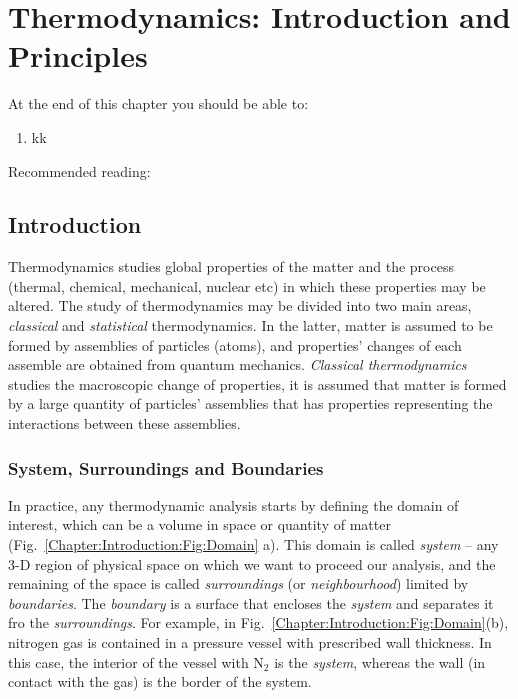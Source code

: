
\chapter{Thermodynamics: Introduction and Principles}\label{Chapter:Introduction}
   \begin{shaded}
      \noindent
      At the end of this chapter you should be able to:
        \begin{enumerate}
           \item kk
        \end{enumerate}
\bigskip
     Recommended reading: \cite{Devoe_Chpt1_2}
   \end{shaded}

\section{Introduction}\label{Chapter:Introduction:Section:Introduction}
Thermodynamics studies global properties of the matter and the process (\eg thermal, chemical, mechanical, nuclear etc) in which these properties may be altered. The study of thermodynamics may be divided into two main areas, {\it classical} and {\it statistical} thermodynamics. In the latter, matter is assumed to be formed by assemblies of particles (\ie atoms), and properties' changes of each assemble are obtained from quantum mechanics. {\it Classical thermodynamics} studies the macroscopic change of properties, \ie it is assumed that matter is formed by a large quantity of particles' assemblies that has properties representing the interactions between these assemblies. 

\subsection{System, Surroundings and Boundaries}\label{Chapter:Introduction:Section:Introduction:SystemSurroundingsBoundaries}
In practice, any thermodynamic analysis starts by defining the domain of interest, which can be a volume in space or quantity of matter (Fig.~\ref{Chapter:Introduction:Fig:Domain} a). This domain is called {\it system} -- \ie any 3-D region of physical space on which we want to proceed our analysis, and the remaining of the space is called {\it surroundings} (or {\it neighbourhood}) limited by {\it boundaries}. The {\it boundary} is a surface that encloses the {\it system} and separates it fro the {\it surroundings}. For example, in Fig.~\ref{Chapter:Introduction:Fig:Domain}(b), nitrogen gas is contained in a pressure vessel with prescribed wall thickness. In this case, the interior of the vessel with N$_{2}$ is the {\it system}, whereas the wall (in contact with the gas) is the border of the system. 

